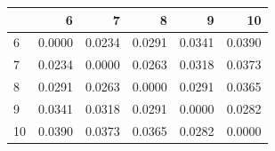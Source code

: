 \begin{tabular}{lrrrrr}
\toprule
 & 6 & 7 & 8 & 9 & 10 \\
\midrule
6 & 0.0000 & 0.0234 & 0.0291 & 0.0341 & 0.0390 \\
7 & 0.0234 & 0.0000 & 0.0263 & 0.0318 & 0.0373 \\
8 & 0.0291 & 0.0263 & 0.0000 & 0.0291 & 0.0365 \\
9 & 0.0341 & 0.0318 & 0.0291 & 0.0000 & 0.0282 \\
10 & 0.0390 & 0.0373 & 0.0365 & 0.0282 & 0.0000 \\
\bottomrule
\end{tabular}
